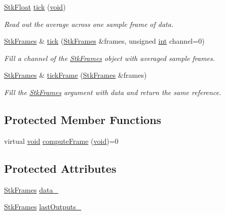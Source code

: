 \begin{DoxyCompactItemize}
\hyperlink{namespace_nyq_a044fa20a706520a617bbbf458a7db7e4}{Stk\+Float} \hyperlink{class_nyq_1_1_wv_in_abf1ff1dd217d642f6d4d38e60fa6053a}{tick} (\hyperlink{sound_8c_ae35f5844602719cf66324f4de2a658b3}{void})
\begin{DoxyCompactList}\small\item\em Read out the average across one sample frame of data. \end{DoxyCompactList}\item 
\hyperlink{class_nyq_1_1_stk_frames}{Stk\+Frames} \& \hyperlink{class_nyq_1_1_wv_in_a194f2c5d9630d516edec589c0265a1e9}{tick} (\hyperlink{class_nyq_1_1_stk_frames}{Stk\+Frames} \&frames, unsigned \hyperlink{xmltok_8h_a5a0d4a5641ce434f1d23533f2b2e6653}{int} channel=0)
\begin{DoxyCompactList}\small\item\em Fill a channel of the \hyperlink{class_nyq_1_1_stk_frames}{Stk\+Frames} object with averaged sample frames. \end{DoxyCompactList}\item 
\hyperlink{class_nyq_1_1_stk_frames}{Stk\+Frames} \& \hyperlink{class_nyq_1_1_wv_in_a56b4c09ef6e1aed9722bafe59c63025e}{tick\+Frame} (\hyperlink{class_nyq_1_1_stk_frames}{Stk\+Frames} \&frames)
\begin{DoxyCompactList}\small\item\em Fill the \hyperlink{class_nyq_1_1_stk_frames}{Stk\+Frames} argument with data and return the same reference. \end{DoxyCompactList}\end{DoxyCompactItemize}
\subsection*{Protected Member Functions}
\begin{DoxyCompactItemize}
\item 
virtual \hyperlink{sound_8c_ae35f5844602719cf66324f4de2a658b3}{void} \hyperlink{class_nyq_1_1_wv_in_af9ac525ddae1c7bb1a5420945cabe7ce}{compute\+Frame} (\hyperlink{sound_8c_ae35f5844602719cf66324f4de2a658b3}{void})=0
\end{DoxyCompactItemize}
\subsection*{Protected Attributes}
\begin{DoxyCompactItemize}
\item 
\hyperlink{class_nyq_1_1_stk_frames}{Stk\+Frames} \hyperlink{class_nyq_1_1_wv_in_a01d4dacc6073539a8e5d503ceea09597}{data\+\_\+}
\item 
\hyperlink{class_nyq_1_1_stk_frames}{Stk\+Frames} \hyperlink{class_nyq_1_1_wv_in_ae7ce6fc9a48173562aa963d4fff6e523}{last\+Outputs\+\_\+}
\end{DoxyCompactItemize}
